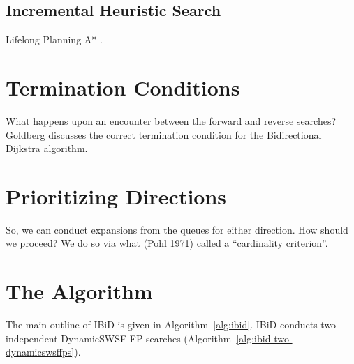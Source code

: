 \documentclass[nobib]{tufte-book}
\begin{document}
\subsection{Incremental Heuristic Search}

Lifelong Planning A* \citep{koenig2004lpastar}.

\section{Termination Conditions}

What happens upon an encounter between the forward and reverse searches?
Goldberg \citep{goldberg2005spexternalmemory}
discusses the correct termination condition for the 
Bidirectional Dijkstra algorithm.

\section{Prioritizing Directions}

So, we can conduct expansions from the queues for either direction.
How should we proceed?
We do so via what (Pohl 1971) called a ``cardinality criterion''.

\section{The Algorithm}

The main outline of IBiD is given in Algorithm~\ref{alg:ibid}.
IBiD conducts two independent DynamicSWSF-FP searches
(Algorithm~\ref{alg:ibid-two-dynamicswsffps}).
\end{document}
